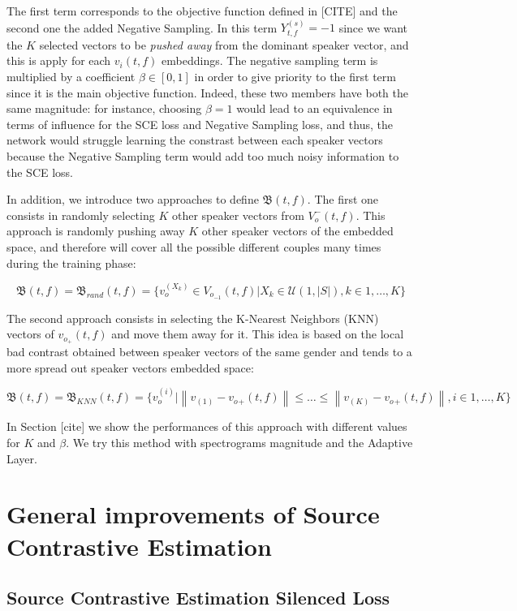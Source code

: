 \documentclass[master, tikz, final,11pt, dvipdfmx]{iscs-thesis}
\newcommand{\norm}[1]{\left\lVert#1\right\rVert}
\begin{document}
The first term corresponds to the objective function defined in [CITE] and the second one the added Negative Sampling. In this term $Y_{t,f}^{(s)} = -1$ since we want the $K$ selected vectors to be \textit{pushed away} from the dominant speaker vector, and this is apply for each $v_i(t,f)$ embeddings. The negative sampling term is multiplied by a coefficient $\beta \in[0,1]$ in order to give priority to the first term since it is the main objective function. Indeed, these two members have both the same magnitude: for instance, choosing $\beta = 1$ would lead to an equivalence in terms of influence for the SCE loss and Negative Sampling loss, and thus, the network would struggle learning the constrast between each speaker vectors because the Negative Sampling term would add too much noisy information to the SCE loss. 

In addition, we introduce two approaches to define $\mathfrak{B}(t,f)$. The first one consists in randomly selecting $K$ other speaker vectors from $V_o^-(t,f)$. This approach is randomly pushing away $K$ other speaker vectors of the embedded space, and therefore will cover all the possible different couples many times during the training phase:

\[\mathfrak{B}(t,f) = \mathfrak{B}_{rand}(t,f) = \{v_o^{(X_k)} \in V_{o_{-1}}(t,f) | X_k \in \mathcal{U}(1,|S|), k \in 1, \dotsc,K\} \]

The second approach consists in selecting the K-Nearest Neighbors (KNN) vectors of $v_{o_{+}}(t,f)$ and move them away for it. This idea is based on the local bad contrast obtained between speaker vectors of the same gender and tends to a more spread out speaker vectors embedded space:


\[\mathfrak{B}(t,f) = \mathfrak{B}_{KNN}(t,f) = \{v_o^{(i)} | \norm{v_{{(1)}}-v_o{_{+}}(t,f)} \leq \dots \leq \norm{v_{{(K)}}-v_o{_{+}}(t,f)}, i \in 1, \dotsc,K\}\]

In Section [cite] we show the performances of this approach with different values for $K$ and $\beta$. We try this method with spectrograms magnitude and the Adaptive Layer.


\section{General improvements of Source Contrastive Estimation}

\subsection{Source Contrastive Estimation Silenced Loss}
\label{contrib:silence}
\end{document}
